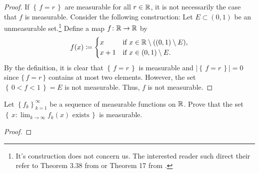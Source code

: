 \begin{proof}
If $\left\{\,f=r\,\right\}$ are measurable for all $r\in\mathbb{R}$, it is not
necessarily the case that $f$ is measurable. Consider the following
construction: Let $E\subset(0,1)$ be an unmeasurable set.\footnote{It's
  construction does not concern us. The interested reader such direct their
  refer to Theorem 3.38 from \cite[Ch.\@ 3, p.\@ 57-58]{wheeden-zygmund} or
  Theorem 17 from \cite[Ch.\@ 2\S 7, p.\@ 48]{royden}.} Define a map
$f\colon\mathbb{R}\to\mathbb{R}$ by
\begin{equation}
\label{eq:sp16:1:11}
f(x)\coloneqq
\begin{cases}
x&\text{if $x\in\mathbb{R}\setminus((0,1)\setminus E)$},\\
x+1&\text{if $x\in (0,1)\setminus E$.}
\end{cases}
\end{equation}
By the definition, it is clear that $\left\{\,f=r\,\right\}$ is measurable
and $\left|\left\{\,f=r\,\right\}\right|=0$ since $\{\,f=r\,\}$ contains at
most two elements. However, the set $\left\{\,0<f<1\,\right\}=E$ is not
measurable. Thus, $f$ is not measurable.
\end{proof}

\begin{problem}
Let $\left\{f_k\right\}_{k=1}^\infty$ be a sequence of measurable functions
on $\mathbb{R}$. Prove that the set
$\left\{\,x:\text{$\lim_{k\to\infty} f_k(x)$ exists}\,\right\}$
is measurable.
\end{problem}
\begin{proof}

\end{proof}

